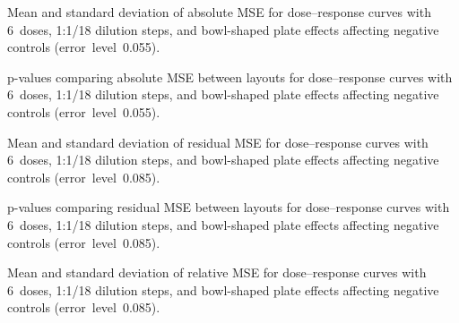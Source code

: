 \clearpage
\begin{table}[p]
    \centering
    \small
    
    \caption{Mean and standard deviation of absolute \ECIC{} MSE for dose--response curves with 6~doses, 1:1/18 dilution steps, and bowl-shaped plate effects affecting negative controls (error~level~0.055).}
    \label{tab:dr-absic50-mean-std-6doses-dil18-bowl-neg-controls-0.055}
\end{table}

\begin{table}[p]
    \centering
    \small
    
    \caption{p-values comparing absolute \ECIC{} MSE between layouts for dose--response curves with 6~doses, 1:1/18 dilution steps, and bowl-shaped plate effects affecting negative controls (error~level~0.055).}
    \label{tab:dr-absic50-pvalues-6doses-dil18-bowl-neg-controls-0.055}
\end{table}

\begin{table}[p]
    \centering
    \small
    
    \caption{Mean and standard deviation of residual MSE for dose--response curves with 6~doses, 1:1/18 dilution steps, and bowl-shaped plate effects affecting negative controls (error~level~0.085).}
    \label{tab:dr-residuals-mean-std-6doses-dil18-bowl-neg-controls-0.085}
\end{table}

\begin{table}[p]
    \centering
    \small
    
    \caption{p-values comparing residual MSE between layouts for dose--response curves with 6~doses, 1:1/18 dilution steps, and bowl-shaped plate effects affecting negative controls (error~level~0.085).}
    \label{tab:dr-residuals-pvalues-6doses-dil18-bowl-neg-controls-0.085}
\end{table}

\begin{table}[p]
    \centering
    \small
    
    \caption{Mean and standard deviation of relative \ECIC{} MSE for dose--response curves with 6~doses, 1:1/18 dilution steps, and bowl-shaped plate effects affecting negative controls (error~level~0.085).}
    \label{tab:dr-relic50-mean-std-6doses-dil18-bowl-neg-controls-0.085}
\end{table}

